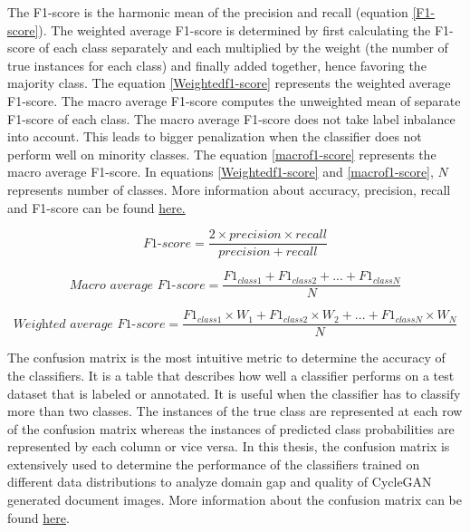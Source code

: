 \newpage
The F1-score is the harmonic mean of the precision and recall (equation \ref{F1-score}). The weighted average F1-score is determined by first calculating the F1-score of each class separately and each multiplied by the weight (the number of true instances for each class) and finally added together, hence favoring the majority class\footnotemark. The equation \ref{Weightedf1-score} represents the weighted average F1-score. The macro average F1-score computes the unweighted mean of separate F1-score of each class. The macro average F1-score does not take label inbalance into account\footnotemark[\value{footnote}]. This leads to bigger penalization when the classifier does not perform well on minority classes. The equation \ref{macrof1-score} represents the macro average F1-score. In equations \ref{Weightedf1-score} and \ref{macrof1-score}, $N$ represents number of classes. More information about accuracy, precision, recall and F1-score can be found \href{https://en.wikipedia.org/wiki/Precision_and_recall}{here.}



\begin{equation}\label{F1-score}
\textit{F1-score} = \frac{2 \times precision \times recall}{precision + recall}
\end{equation}


\begin{equation}\label{macrof1-score} 
\textit{Macro average F1-score} =  \frac{F1_{class1} + F1_{class2}+ ... + F1_{classN}}{N}
\end{equation}


\begin{equation}\label{Weightedf1-score} 
\textit{Weighted average F1-score} =  \frac{F1_{class1} \times W_1 + F1_{class2} \times W_2 + ... + F1_{classN} \times W_N}{N}
\end{equation}

The confusion matrix is the most intuitive metric to determine the accuracy of the classifiers. It is a table that describes how well a classifier performs on a test dataset that is labeled or annotated. It is useful when the classifier has to classify more than two classes. The instances of the true class are represented at each row of the confusion matrix whereas the instances of predicted class probabilities are represented by each column or vice versa. In this thesis, the confusion matrix is extensively used to determine the performance of the classifiers trained on different data distributions to analyze domain gap and quality of \ac{CycleGAN} generated document images. More information about the confusion matrix can be found \href{https://en.wikipedia.org/wiki/Confusion_matrix}{here}.

